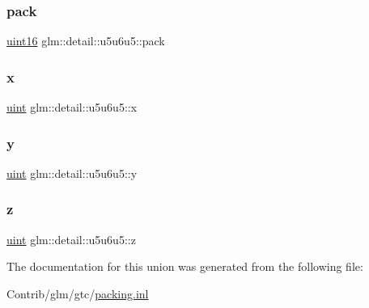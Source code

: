 \mbox{\label{unionglm_1_1detail_1_1u5u6u5_a5ea89c1a491b7e1442cad93d92628b2e}} 
\subsubsection{\texorpdfstring{pack}{pack}}
{\footnotesize\ttfamily \mbox{\hyperlink{namespaceglm_1_1detail_a47b2a7d006d187338e8031a352d1ce56}{uint16}} glm\+::detail\+::u5u6u5\+::pack}

\mbox{\label{unionglm_1_1detail_1_1u5u6u5_ae265d637dd0e4430f3e96a509e19fb06}} 
\subsubsection{\texorpdfstring{x}{x}}
{\footnotesize\ttfamily \mbox{\hyperlink{group__core__precision_ga4fd29415871152bfb5abd588334147c8}{uint}} glm\+::detail\+::u5u6u5\+::x}

\mbox{\label{unionglm_1_1detail_1_1u5u6u5_ab60581ca18c5faa107d8cbd5cfa946c9}} 
\subsubsection{\texorpdfstring{y}{y}}
{\footnotesize\ttfamily \mbox{\hyperlink{group__core__precision_ga4fd29415871152bfb5abd588334147c8}{uint}} glm\+::detail\+::u5u6u5\+::y}

\mbox{\label{unionglm_1_1detail_1_1u5u6u5_ae0c24b8bea4457e78fe32f6e0cee6369}} 
\subsubsection{\texorpdfstring{z}{z}}
{\footnotesize\ttfamily \mbox{\hyperlink{group__core__precision_ga4fd29415871152bfb5abd588334147c8}{uint}} glm\+::detail\+::u5u6u5\+::z}



The documentation for this union was generated from the following file\+:\begin{DoxyCompactItemize}
\item 
Contrib/glm/gtc/\mbox{\hyperlink{packing_8inl}{packing.\+inl}}\end{DoxyCompactItemize}
